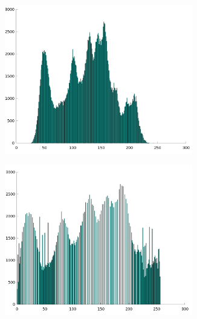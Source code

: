 \documentclass{article}
\begin{document}
\begin{figure}[H]
    \begin{subfigure}{0.5\textwidth}
        \includegraphics[width=0.9\textwidth]{histoLena.png} %
    \end{subfigure}\hfill
    \begin{subfigure}{0.5\textwidth}
        \includegraphics[width=0.9\textwidth]{histoLenaEq.png} %
    \end{subfigure}
\end{figure}
\end{document}
